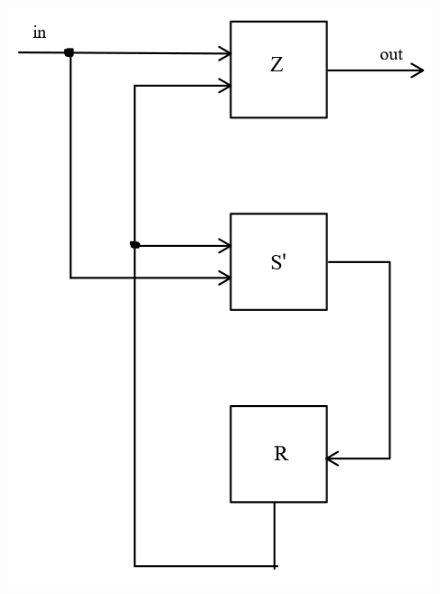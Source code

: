\documentclass{article}
\begin{document}
\begin{enumerate}
\begin{enumerate}
\begin{figure}[htbp]
            \includegraphics[scale=0.3]{img/parita_mealy_rete.png}
            \centering
        \end{figure}
    \end{enumerate}

\newpage


\end{enumerate}
\end{document}
